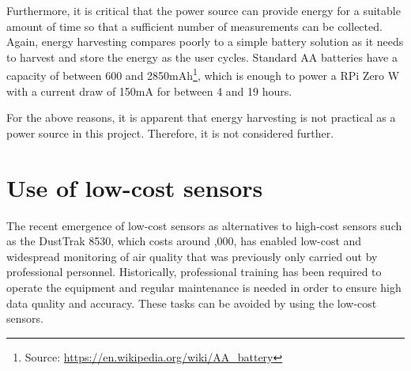 \documentclass[11pt]{report}
\begin{document}

Furthermore, it is critical that the power source can provide energy for a suitable amount of time so that a sufficient number of measurements can be collected. Again, energy harvesting compares poorly to a simple battery solution as it needs to harvest and store the energy as the user cycles. Standard AA batteries have a capacity of between 600 and 2850mAh\footnote{Source: \href{https://en.wikipedia.org/wiki/AA_battery}{\url{https://en.wikipedia.org/wiki/AA_battery}}}, which is enough to power a RPi Zero W with a current draw of 150mA for between 4 and 19 hours.

For the above reasons, it is apparent that energy harvesting is not practical as a power source in this project. Therefore, it is not considered further.






\section{Use of low-cost sensors} \label{lowcostsensors}

The recent emergence of low-cost sensors as alternatives to high-cost sensors such as the DustTrak 8530, which costs around ,000, has enabled low-cost and widespread monitoring of air quality that was previously only carried out by professional personnel. Historically, professional training has been required to operate the equipment and regular maintenance is needed in order to ensure high data quality and accuracy. These tasks can be avoided by using the low-cost sensors.
\end{document}
